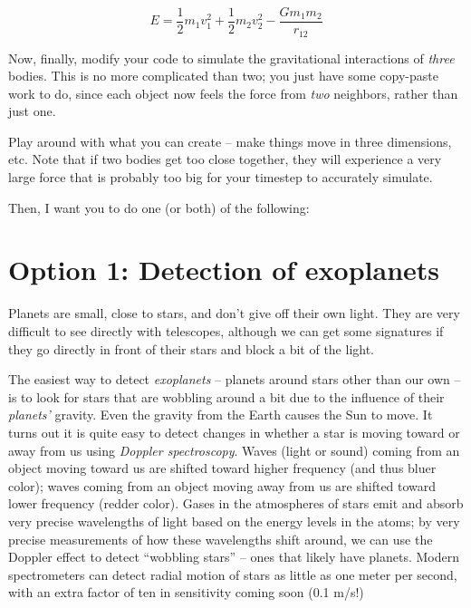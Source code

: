 \documentclass[12pt]{article}
\begin{document}
\begin{enumerate}
{   \begin{equation}
     E = \frac{1}{2}m_1v_1^2 + \frac{1}{2}m_2v_2^2 - \frac{Gm_1m_2}{r_{12}}
   \end{equation}

\item Now, finally, modify your code to simulate the gravitational interactions of {\it 
three} bodies. This is no more complicated than two; you just have some copy-paste work
to do, since each object now feels the force from {\it two} neighbors, rather than just one.

Play around with what you can create -- make things move in three dimensions, etc. Note that if two bodies get too close together,
they will experience a very large force that is probably too big for your timestep to accurately simulate. 
}
  \end{enumerate}

Then, I want you to do one (or both) of the following:

\section{Option 1: Detection of exoplanets}

Planets are small, close to stars, and don't give off their own light. They are very difficult to see directly with telescopes, although we can get some signatures if they go directly in front of their stars and block a bit of the light.

The easiest way to detect {\it exoplanets} -- planets around stars other than our own -- is to look for stars that are wobbling around a bit due to the influence of their {\it planets'} gravity. Even the gravity from the Earth causes the Sun to move. 
It turns out it is quite easy to detect changes in whether a star is moving toward or away from us using {\it Doppler spectroscopy}. Waves (light or sound) coming from an object moving toward us are shifted toward higher frequency (and thus bluer color); 
waves coming from an object moving away from us are shifted toward lower frequency (redder color). Gases in the atmospheres of stars emit and absorb very precise wavelengths of light based on the energy levels in the atoms; by very precise measurements of how these
wavelengths shift around, we can use the Doppler effect to detect ``wobbling stars'' -- ones that likely have planets. Modern spectrometers can detect radial motion of stars as little as one meter per second, with an extra factor of ten in sensitivity coming soon
(0.1 m/s!)
\end{document}
